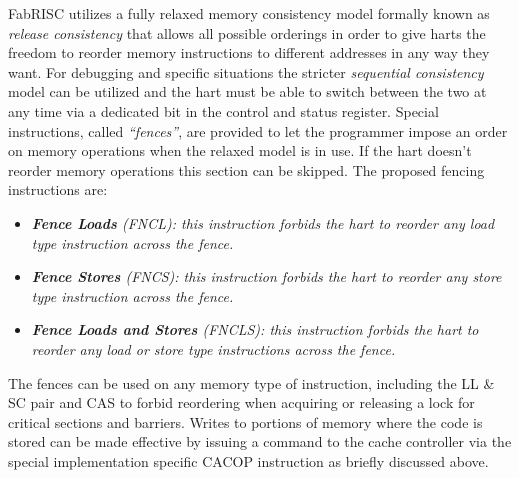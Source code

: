 \documentclass{article}
\begin{document}
            \vspace{10pt}

            FabRISC utilizes a fully relaxed memory consistency model formally known as \textit{release consistency} that allows all possible orderings in order to give harts the freedom to reorder memory instructions to different addresses in any way they want. For debugging and specific situations the stricter \textit{sequential consistency} model can be utilized and the hart must be able to switch between the two at any time via a dedicated bit in the control and status register. Special instructions, called \textit{``fences''}, are provided to let the programmer impose an order on memory operations when the relaxed model is in use. If the hart doesn't reorder memory operations this section can be skipped. The proposed fencing instructions are:

            \begin{itemize}

                \item \textit{\textbf{Fence Loads} (FNCL): this instruction forbids the hart to reorder any load type instruction across the fence.}

                \item \textit{\textbf{Fence Stores} (FNCS): this instruction forbids the hart to reorder any store type instruction across the fence.}

                \item \textit{\textbf{Fence Loads and Stores} (FNCLS): this instruction forbids the hart to reorder any load or store type instructions across the fence.}

            \end{itemize}

            The fences can be used on any memory type of instruction, including the LL \& SC pair and CAS to forbid reordering when acquiring or releasing a lock for critical sections and barriers. Writes to portions of memory where the code is stored can be made effective by issuing a command to the cache controller via the special implementation specific CACOP instruction as briefly discussed above.
\end{document}
